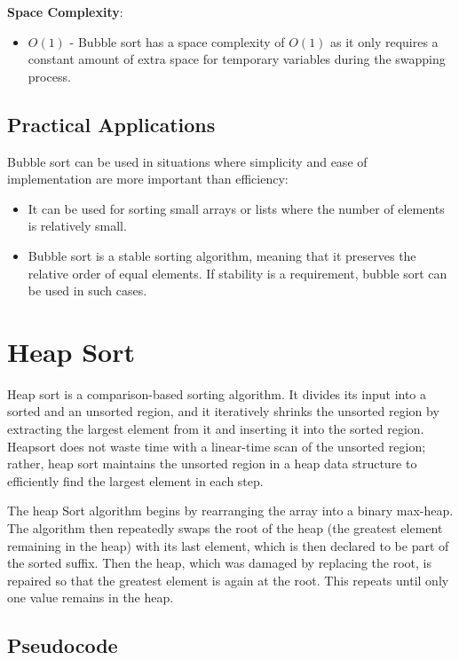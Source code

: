 \documentclass[sigplan,screen]{acmart}
\begin{document}
\textbf{Space Complexity}:
\begin{itemize}
    \item $O(1)$ - Bubble sort has a space complexity of $O(1)$ as it only requires a constant amount of extra space for temporary variables during the swapping process.
\end{itemize}


\subsection{Practical Applications}

Bubble sort can be used in situations where simplicity and ease of implementation are more important than efficiency:
\begin{itemize}
       \item It can be used for sorting small arrays or lists where the number of elements is relatively small. 
       \item  Bubble sort is a stable sorting algorithm, meaning that it preserves the relative order of equal elements. If stability is a requirement, bubble sort can be used in such cases.
\end{itemize}


\section{Heap Sort}

Heap sort is a comparison-based sorting algorithm. It divides its input into a sorted and an unsorted region, and it iteratively shrinks the unsorted region by extracting the largest element from it and inserting it into the sorted region. Heapsort does not waste time with a linear-time scan of the unsorted region; rather, heap sort maintains the unsorted region in a heap data structure to efficiently find the largest element in each step.

The heap Sort algorithm begins by rearranging the array into a binary max-heap. The algorithm then repeatedly swaps the root of the heap (the greatest element remaining in the heap) with its last element, which is then declared to be part of the sorted suffix. Then the heap, which was damaged by replacing the root, is repaired so that the greatest element is again at the root. This repeats until only one value remains in the heap.



\subsection{Pseudocode}
\end{document}
